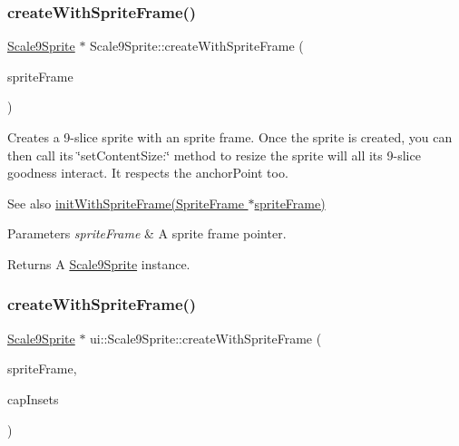 \subsubsection{\texorpdfstring{create\+With\+Sprite\+Frame()}{createWithSpriteFrame()}\hspace{0.1cm}{\footnotesize\ttfamily [2/4]}}
{\footnotesize\ttfamily \hyperlink{classui_1_1Scale9Sprite}{Scale9\+Sprite} $\ast$ Scale9\+Sprite\+::create\+With\+Sprite\+Frame (\begin{DoxyParamCaption}\item[{\hyperlink{classSpriteFrame}{Sprite\+Frame} $\ast$}]{sprite\+Frame }\end{DoxyParamCaption})\hspace{0.3cm}{\ttfamily [static]}}

Creates a 9-\/slice sprite with an sprite frame. Once the sprite is created, you can then call its \char`\"{}set\+Content\+Size\+:\char`\"{} method to resize the sprite will all it\textquotesingle{}s 9-\/slice goodness interact. It respects the anchor\+Point too.

\begin{DoxySeeAlso}{See also}
\hyperlink{classui_1_1Scale9Sprite_a77f0c229307f987be75ebad959cb2b18}{init\+With\+Sprite\+Frame(\+Sprite\+Frame $\ast$sprite\+Frame)} 
\end{DoxySeeAlso}

\begin{DoxyParams}{Parameters}
{\em sprite\+Frame} & A sprite frame pointer. \\
\hline
\end{DoxyParams}
\begin{DoxyReturn}{Returns}
A \hyperlink{classui_1_1Scale9Sprite}{Scale9\+Sprite} instance. 
\end{DoxyReturn}
\mbox{\label{classui_1_1Scale9Sprite_a5b0809cd1de2816d5936fe7352af99e5}} 
\subsubsection{\texorpdfstring{create\+With\+Sprite\+Frame()}{createWithSpriteFrame()}\hspace{0.1cm}{\footnotesize\ttfamily [3/4]}}
{\footnotesize\ttfamily \hyperlink{classui_1_1Scale9Sprite}{Scale9\+Sprite} $\ast$ ui\+::\+Scale9\+Sprite\+::create\+With\+Sprite\+Frame (\begin{DoxyParamCaption}\item[{\hyperlink{classSpriteFrame}{Sprite\+Frame} $\ast$}]{sprite\+Frame,  }\item[{const \hyperlink{classRect}{Rect} \&}]{cap\+Insets }\end{DoxyParamCaption})\hspace{0.3cm}{\ttfamily [static]}}

